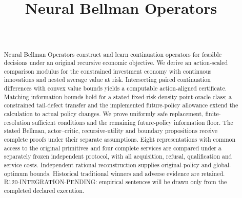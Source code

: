 \documentclass[ecta,nameyear,draft]{econsocart}
\begin{document}
\begin{frontmatter}
\title{Neural Bellman Operators}
\begin{aug}
\author[id=au1,addressref={add1}]{~}
\address[id=add1]{Peking University}
\end{aug}
\begin{abstract}
Neural Bellman Operators construct and learn continuation operators for feasible
decisions under an original recursive economic objective. We derive an
action-scaled comparison modulus for the constrained investment economy with
continuous innovations and nested average value at risk. Intersecting paired
continuation differences with convex value bounds yields a computable
action-aligned certificate. Matching information bounds hold for a stated
fixed-risk-density point-oracle class; a constrained tail-defect transfer and
the implemented future-policy allowance extend the calculation to actual policy
changes. We prove uniformly safe replacement, finite-resolution sufficient
conditions and the remaining future-policy information floor. The stated Bellman,
actor--critic, recursive-utility and boundary propositions receive complete
proofs under their separate assumptions. Eight representations with common
access to the original primitives and four complete services are compared
under a separately frozen independent protocol, with all acquisition,
refusal, qualification and service costs. Independent rational reconstruction
supplies original-policy and global-optimum bounds. Historical traditional
winners and adverse evidence are retained. R120-INTEGRATION-PENDING: empirical
sentences will be drawn only from the completed declared execution.
\end{abstract}
\begin{keyword}
\end{keyword}
\end{frontmatter}












\end{document}
